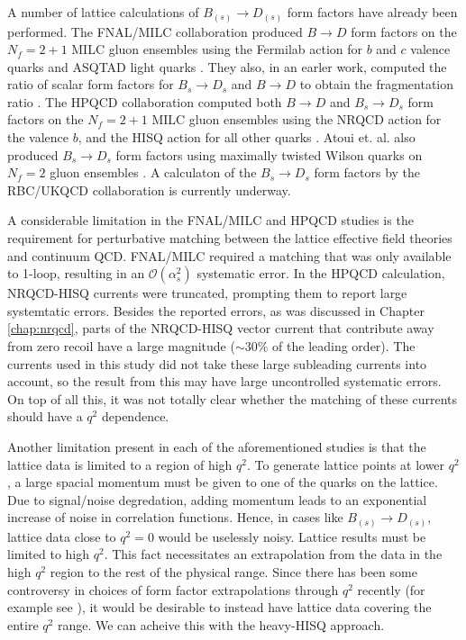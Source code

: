 A number of lattice calculations of $B_{(s)} \to D_{(s)}$ form factors have already been performed. The FNAL/MILC collaboration produced $B\to D$ form factors on the $N_f=2+1$ MILC gluon ensembles using the Fermilab action for $b$ and $c$ valence quarks and ASQTAD light quarks \cite{Lattice:2015rga}. They also, in an earler work, computed the ratio of scalar form factors for $B_s\to D_s$ and $B\to D$ to obtain the fragmentation ratio \cite{PhysRevD.85.114502}. The HPQCD collaboration computed both $B\to D$ and $B_s\to D_s$ form factors on the $N_f=2+1$ MILC gluon ensembles using the NRQCD action for the valence $b$, and the HISQ action for all other quarks \cite{Na:2015kha,Monahan:2017uby}. Atoui et. al. also produced $B_s\to D_s$ form factors using maximally twisted Wilson quarks on $N_f=2$ gluon ensembles \cite{Atoui2014}. A calculaton of the $B_s\to D_s$ form factors by the RBC/UKQCD collaboration is currently underway.

A considerable limitation in the FNAL/MILC and HPQCD studies is the requirement for perturbative matching between the lattice effective field theories and continuum QCD. FNAL/MILC required a matching that was only available to 1-loop, resulting in an $\mathcal{O}(\alpha_s^2)$ systematic error. In the HPQCD calculation, NRQCD-HISQ currents were truncated, prompting them to report large systemtatic errors. Besides the reported errors, as was discussed in Chapter \ref{chap:nrqcd}, parts of the NRQCD-HISQ vector current that contribute away from zero recoil have a large magnitude ($\sim 30\%$ of the leading order). The currents used in this study did not take these large subleading currents into account, so the result from this may have large uncontrolled systematic errors. On top of all this, it was not totally clear whether the matching of these currents should have a $q^2$ dependence.

Another limitation present in each of the aforementioned studies is that the lattice data is limited to a region of high $q^2$. To generate lattice points at lower $q^2$, a large spacial momentum must be given to one of the quarks on the lattice. Due to signal/noise degredation, adding momentum leads to an exponential increase of noise in correlation functions. Hence, in cases like $B_{(s)}\to D_{(s)}$, lattice data close to $q^2=0$ would be uselessly noisy. Lattice results must be limited to high $q^2$. This fact necessitates an extrapolation from the data in the high $q^2$ region to the rest of the physical range. Since there has been some controversy in choices of form factor extrapolations through $q^2$ recently (for example see \cite{Bigi:2017njr,Grinstein:2017nlq}), it would be desirable to instead have lattice data covering the entire $q^2$ range. We can acheive this with the heavy-HISQ approach.


